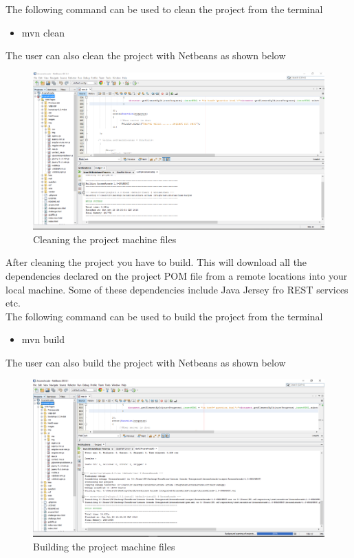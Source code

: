 \documentclass[english]{article}
\begin{document}
The following command can be used to clean the project from the terminal
 \begin{itemize}
	 
	 \item mvn clean
\end{itemize}

 The user can also clean the project with Netbeans as shown below\\
 
 	\begin{figure}[H]
 		
 		\includegraphics[width=1.0\textwidth]{clean.png}
 		\caption{Cleaning the project machine files}
 	\end{figure}
  
 
After cleaning the project you have to build. This will download all the dependencies declared on the project POM file from a remote locations into your local machine.
Some of these dependencies include Java Jersey fro REST services etc. \\

The following command can be used to build the project from the terminal
  \begin{itemize}
  	
  	\item mvn build
  	
  \end{itemize}
  The user can also build the project with Netbeans as shown below\\
  
  \begin{figure}[H]
  	
  	\includegraphics[width=1.0\textwidth]{build.png}
  	\caption{Building the project machine files}
  \end{figure}
\end{document}
